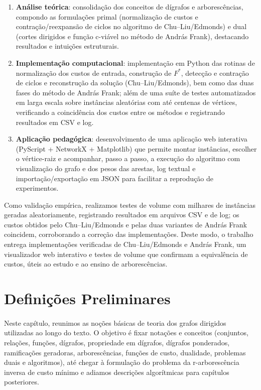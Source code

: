 \documentclass[12pt,a4paper]{article}
\begin{document}
\begin{enumerate}
    \item \textbf{Análise teórica}: consolidação dos conceitos de dígrafos e arborescências, compondo as formulações primal (normalização de custos e contração/reexpansão de ciclos no algoritmo de Chu--Liu/Edmonds) e dual (cortes dirigidos e função c-viável no método de András Frank), destacando resultados e intuições estruturais.
    \item \textbf{Implementação computacional}: implementação em Python das rotinas de normalização dos custos de entrada, construção de \(F^\ast\), detecção e contração de ciclos e reconstrução da solução (Chu--Liu/Edmonds), bem como das duas fases do método de András Frank; além de uma suíte de testes automatizados em larga escala sobre instâncias aleatórias com até centenas de vértices, verificando a coincidência dos custos entre os métodos e registrando resultados em CSV e log.
    \item \textbf{Aplicação pedagógica}: desenvolvimento de uma aplicação web interativa (PyScript + NetworkX + Matplotlib) que permite montar instâncias, escolher o vértice-raiz e acompanhar, passo a passo, a execução do algoritmo com visualização do grafo e dos pesos das arestas, log textual e importação/exportação em JSON para facilitar a reprodução de experimentos.
\end{enumerate}

Como validação empírica, realizamos testes de volume com milhares de instâncias geradas aleatoriamente, registrando resultados em arquivos CSV e de log; os custos obtidos pelo Chu--Liu/Edmonds e pelas duas variantes de András Frank coincidem, corroborando a correção das implementações. Deste modo, o trabalho entrega implementações verificadas de Chu--Liu/Edmonds e András Frank, um visualizador web interativo e testes de volume que confirmam a equivalência de custos, úteis ao estudo e ao ensino de arborescências.

\section{Definições Preliminares}
\paragraph{}
Neste capítulo, reunimos as noções básicas de teoria dos grafos dirigidos utilizadas ao longo do texto. O objetivo é fixar notações e conceitos (conjuntos, relações, funções, dígrafos, propriedade em dígrafos, dígrafos ponderados, ramificações geradoras, arborescências, funções de custo, dualidade, problemas duais e algoritmos), até chegar à formulação do problema da r-arborescência inversa de custo mínimo e adiamos descrições algorítmicas para capítulos posteriores.
\end{document}
